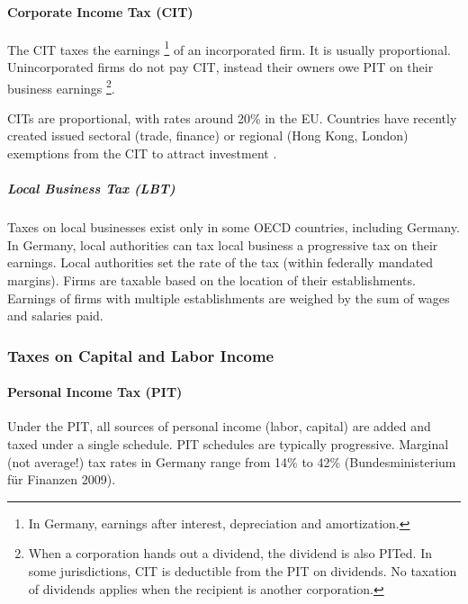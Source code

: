 \paragraph{Corporate Income Tax (CIT)}  \label{sec:CIT} The  \gls{CIT} taxes the earnings
\footnote{
	In Germany, earnings after interest, depreciation and amortization.
}
of an incorporated firm.
It is usually proportional.
Unincorporated firms do not pay \gls{CIT}, instead their owners owe \gls{PIT} on their business earnings
\footnote{
	When a corporation hands out a dividend, the dividend is also \gls{PIT}ed.
	In some jurisdictions, \gls{CIT} is deductible from the \gls{PIT} on dividends.
	No taxation of dividends applies when the recipient is another corporation.
}.

\glspl{CIT} are proportional, with rates around 20\% in the EU.
Countries have recently created issued sectoral (trade, finance) or regional (Hong Kong, London) exemptions from the \gls{CIT} to attract investment \citep{Genschel2009,Ganghof2007,Genschel2005}.

\subparagraph{Local Business Tax (LBT)}  \label{sec:LBT} Taxes on local businesses exist only in some OECD countries, including Germany.
In Germany, local authorities can tax local business a progressive tax on their earnings.
Local authorities set the rate of the tax (within federally mandated margins).
Firms are taxable based on the location of their establishments.
Earnings of firms with multiple establishments are weighed by the sum of wages and salaries paid.

\subsubsection{Taxes on Capital and Labor Income}

\paragraph{Personal Income Tax (PIT)}  \label{sec:PIT} Under the  \gls{PIT}, all sources of personal income (labor, capital) are added and taxed under a single schedule.
\gls{PIT} schedules are typically progressive.
Marginal (not average!) tax rates in Germany range from 14\% to 42\% (Bundesministerium für Finanzen 2009).


